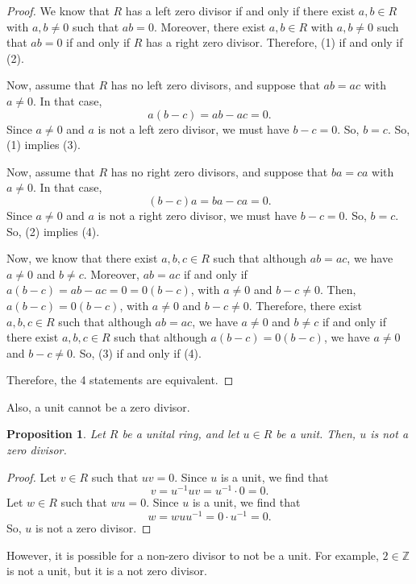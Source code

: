 \documentclass[a4paper, openany]{memoir}
\theoremstyle{definition}
\theoremstyle{plain}
\newtheorem{proposition}[definition]{Proposition}
\begin{document}
\begin{proof}
We know that $R$ has a left zero divisor if and only if there exist $a, b \in R$ with $a, b \neq 0$ such that $ab = 0$. Moreover, there exist $a, b \in R$ with $a, b \neq 0$ such that $ab = 0$ if and only if $R$ has a right zero divisor. Therefore, (1) if and only if (2).

\noindent Now, assume that $R$ has no left zero divisors, and suppose that $ab = ac$ with $a \neq 0$. In that case, 
\[a(b - c) = ab - ac = 0.\]
Since $a \neq 0$ and $a$ is not a left zero divisor, we must have $b - c = 0$. So, $b = c$. So, (1) implies (3).

\noindent Now, assume that $R$ has no right zero divisors, and suppose that $ba = ca$ with $a \neq 0$. In that case, 
\[(b - c)a = ba - ca = 0.\]
Since $a \neq 0$ and $a$ is not a right zero divisor, we must have $b - c = 0$. So, $b = c$. So, (2) implies (4).

\noindent Now, we know that there exist $a, b, c \in R$ such that although $ab = ac$, we have $a \neq 0$ and $b \neq c$. Moreover, $ab = ac$ if and only if $a(b - c) = ab - ac = 0 = 0(b - c)$, with $a \neq 0$ and $b - c \neq 0$. Then, $a(b - c) = 0(b - c)$, with $a \neq 0$ and $b - c \neq 0$. Therefore, there exist $a, b, c \in R$ such that although $ab = ac$, we have $a \neq 0$ and $b \neq c$ if and only if there exist $a, b, c \in R$ such that although $a(b - c) = 0(b - c)$, we have $a \neq 0$ and $b - c \neq 0$. So, (3) if and only if (4).

\noindent Therefore, the 4 statements are equivalent.
\end{proof}
\noindent Also, a unit cannot be a zero divisor.
\begin{proposition}
Let $R$ be a unital ring, and let $u \in R$ be a unit. Then, $u$ is not a zero divisor.
\end{proposition}
\begin{proof}
Let $v \in R$ such that $uv = 0$. Since $u$ is a unit, we find that
\[v = u^{-1}uv = u^{-1} \cdot 0 = 0.\]
Let $w \in R$ such that $wu = 0$. Since $u$ is a unit, we find that
\[w = wuu^{-1} = 0 \cdot u^{-1} = 0.\]
So, $u$ is not a zero divisor.
\end{proof}
\noindent However, it is possible for a non-zero divisor to not be a unit. For example, $2 \in \mathbb{Z}$ is not a unit, but it is a not zero divisor.
\end{document}
